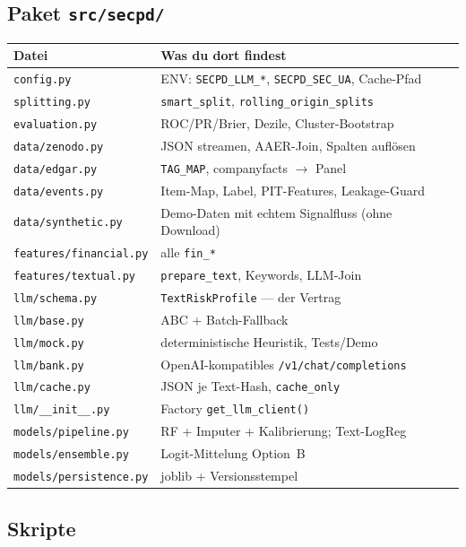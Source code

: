 \documentclass[11pt,a4paper]{article}
\newcommand{\file}[1]{\texttt{\small #1}}
\begin{document}
\subsection{Paket \texttt{src/secpd/}}

\begin{tabularx}{\textwidth}{@{}l X@{}}
\toprule
Datei & Was du dort findest \\
\midrule
\file{config.py} & ENV: \texttt{SECPD\_LLM\_*}, \texttt{SECPD\_SEC\_UA}, Cache-Pfad \\
\file{splitting.py} & \texttt{smart\_split}, \texttt{rolling\_origin\_splits} \\
\file{evaluation.py} & ROC/PR/Brier, Dezile, Cluster-Bootstrap \\
\file{data/zenodo.py} & JSON streamen, AAER-Join, Spalten auflösen \\
\file{data/edgar.py} & \texttt{TAG\_MAP}, companyfacts $\rightarrow$ Panel \\
\file{data/events.py} & Item-Map, Label, PIT-Features, Leakage-Guard \\
\file{data/synthetic.py} & Demo-Daten mit echtem Signalfluss (ohne Download) \\
\file{features/financial.py} & alle \texttt{fin\_*} \\
\file{features/textual.py} & \texttt{prepare\_text}, Keywords, LLM-Join \\
\file{llm/schema.py} & \texttt{TextRiskProfile} --- der Vertrag \\
\file{llm/base.py} & ABC + Batch-Fallback \\
\file{llm/mock.py} & deterministische Heuristik, Tests/Demo \\
\file{llm/bank.py} & OpenAI-kompatibles \texttt{/v1/chat/completions} \\
\file{llm/cache.py} & JSON je Text-Hash, \texttt{cache\_only} \\
\file{llm/\_\_init\_\_.py} & Factory \texttt{get\_llm\_client()} \\
\file{models/pipeline.py} & RF + Imputer + Kalibrierung; Text-LogReg \\
\file{models/ensemble.py} & Logit-Mittelung Option~B \\
\file{models/persistence.py} & joblib + Versionsstempel \\
\bottomrule
\end{tabularx}

\subsection{Skripte}
\end{document}
